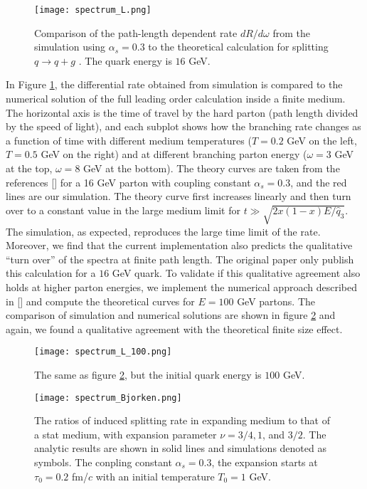 \begin{figure}
\centering
\texttt{[image: spectrum\_L.png]}
\caption{Comparison of the path-length dependent rate $dR/d\omega$ from the simulation using $\alpha_s = 0.3$ to the theoretical calculation for splitting $q\rightarrow q+g$ \cite{CaronHuot:2010bp}. The quark energy is $16$ GeV.}
\label{fig:spectra-L-alphas=0.3}
\end{figure}

In Figure \ref{fig:spectra-L-alphas=0.3}, the differential rate obtained from simulation is compared to the numerical solution of the full leading order calculation inside a finite medium.
The horizontal axis is the time of travel by the hard parton (path length divided by the speed of light), and each subplot shows how the branching rate changes as a function of time with different medium temperatures ($T=0.2$ GeV on the left, $T=0.5$ GeV on the right) and at different branching parton energy ($\omega=3$ GeV at the top, $\omega=8$ GeV at the bottom).
The theory curves are taken from the references [] for a 16 GeV parton with coupling constant $\alpha_s = 0.3$, and the red lines are our simulation.
The theory curve first increases linearly and then turn over to a constant value in the large medium limit for $t \gg \sqrt{2x(1-x)E/\hat{q}_3}$.
The simulation, as expected, reproduces the large time limit of the rate.
Moreover, we find that the current implementation also predicts the qualitative ``turn over'' of the spectra at finite path length.
The original paper only publish this calculation for a $16$ GeV quark. 
To validate if this qualitative agreement also holds at higher parton energies, we implement the numerical approach described in [] and compute the theoretical curves for $E=100$ GeV partons.
The comparison of simulation and numerical solutions are shown in figure \ref{fig:spectra-L-alphas=0.3-E100} and again, we found a qualitative agreement with the theoretical finite size effect.


\begin{figure}
\centering
\texttt{[image: spectrum\_L\_100.png]}
\caption{The same as figure \ref{fig:spectra-L-alphas=0.3-E100}, but the initial quark energy is $100$ GeV.}
\label{fig:spectra-L-alphas=0.3-E100}
\end{figure}


\begin{figure}
\texttt{[image: spectrum\_Bjorken.png]}
\caption{The ratios of induced splitting rate in expanding medium to that of a stat medium, with expansion parameter $\nu = 3/4, 1$, and $3/2$. The analytic results are shown in solid lines and simulations denoted as symbols. The conpling constant $\alpha_s=0.3$, the expansion starts at $\tau_0 = 0.2$ fm/$c$ with an initial temperature $T_0 = 1$ GeV.}
\label{fig:Bjorken-BDMPS}
\end{figure}

